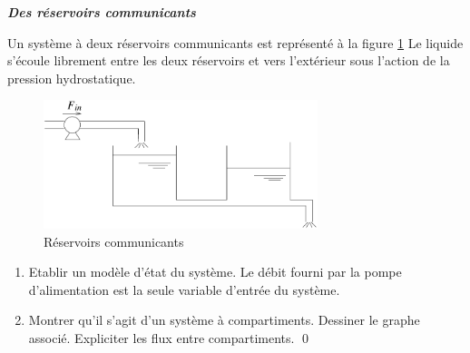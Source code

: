 \begin{exercice}{\bf \em Des réservoirs communicants}

Un système à deux réservoirs communicants est représenté à la
figure \ref{Fig:reservoircom} Le liquide s'écoule librement entre les deux
réservoirs et vers l'extérieur sous l'action de la pression hydrostatique.

\begin{figure}[h]
\begin{center}
\includegraphics[width=8cm]{images/reservoircom}
\caption{Réservoirs communicants}
\label{Fig:reservoircom}
\end{center} 
\end{figure}

\begin{enumerate}
\item Etablir un modèle d'état du système. Le débit fourni par la
pompe d'alimentation est la seule variable d'entrée du système.
\item Montrer qu'il s'agit d'un système à compartiments. Dessiner le
graphe associé. Expliciter les flux entre compartiments. \qed
\end{enumerate}
\end{exercice}



